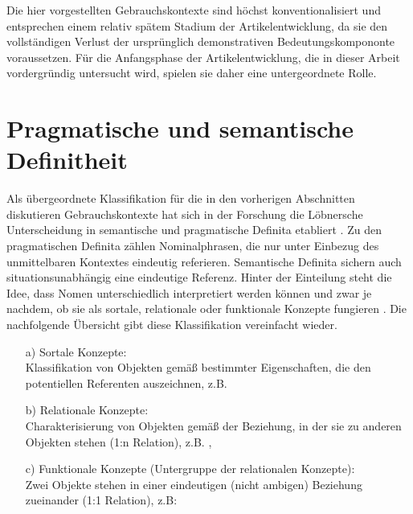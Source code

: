 \begin{exe}
	\ex \label{ex:sprichwort}   
	\begin{xlist}
		\ex \label{ex:zeilen}  
		\ex \label{ex:fest}  
		\end{xlist}
\end{exe}

Die hier vorgestellten Gebrauchskontexte sind höchst konventionalisiert und entsprechen einem relativ spätem Stadium der Artikelentwicklung, da sie den vollständigen Verlust der ursprünglich demonstrativen Bedeutungskompononte voraussetzen. Für die Anfangsphase der Artikelentwicklung, die in dieser Arbeit vordergründig untersucht wird, spielen sie daher eine untergeordnete Rolle.


\section{Pragmatische und semantische Definitheit}\label{sec:pragsem}

Als übergeordnete Klassifikation für die in den vorherigen Abschnitten diskutieren Gebrauchskontexte hat sich in der Forschung die Löbnersche Unterscheidung in semantische und pragmatische Definita \parencite{Lobner1985} etabliert \parencite{Himmelmann1997, Demske2001,Nubling2005,Napoli2009,Szczepaniak2011a}. Zu den pragmatischen Definita zählen Nominalphrasen, die nur unter Einbezug des unmittelbaren Kontextes eindeutig referieren. Semantische Definita sichern auch situationsunabhängig eine eindeutige Referenz. Hinter der Einteilung steht die Idee, dass Nomen unterschiedlich interpretiert werden können und zwar je nachdem, ob sie als sortale, relationale oder funktionale Konzepte fungieren \parencite{Lobner1985,Lobner1998}. Die nachfolgende Übersicht gibt diese Klassifikation vereinfacht wieder. 

\begin{itemize} 
		\item[a)] \label{sort} Sortale Konzepte: \\ Klassifikation von Objekten gemäß bestimmter Eigenschaften, die den potentiellen Referenten auszeichnen, z.B.  
		\item[b)] \label{relat} Relationale Konzepte: \\  Charakterisierung von Objekten gemäß der Beziehung, in der sie zu anderen Objekten stehen (1:n Relation), z.B. ,  
		\item[c)] \label{funkt} Funktionale Konzepte (Untergruppe der relationalen Konzepte): \\  Zwei Objekte stehen in einer eindeutigen (nicht ambigen) Beziehung zueinander (1:1 Relation), z.B:  
\end{itemize} 

